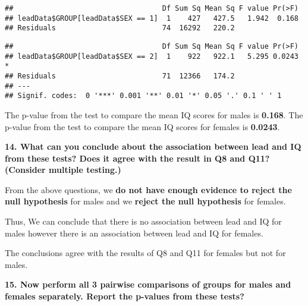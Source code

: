 \documentclass[
]{article}
\newenvironment{Shaded}{\begin{snugshade}}{\end{snugshade}}
\newcommand{\DataTypeTok}[1]{\textcolor[rgb]{0.13,0.29,0.53}{#1}}
\newcommand{\DecValTok}[1]{\textcolor[rgb]{0.00,0.00,0.81}{#1}}
\newcommand{\KeywordTok}[1]{\textcolor[rgb]{0.13,0.29,0.53}{\textbf{#1}}}
\newcommand{\NormalTok}[1]{#1}
\newcommand{\OperatorTok}[1]{\textcolor[rgb]{0.81,0.36,0.00}{\textbf{#1}}}
\newcommand{\StringTok}[1]{\textcolor[rgb]{0.31,0.60,0.02}{#1}}
\begin{document}
\begin{verbatim}
##                                   Df Sum Sq Mean Sq F value Pr(>F)
## leadData$GROUP[leadData$SEX == 1]  1    427   427.5   1.942  0.168
## Residuals                         74  16292   220.2
\end{verbatim}

\begin{Shaded}
\end{Shaded}

\begin{verbatim}
##                                   Df Sum Sq Mean Sq F value Pr(>F)  
## leadData$GROUP[leadData$SEX == 2]  1    922   922.1   5.295 0.0243 *
## Residuals                         71  12366   174.2                 
## ---
## Signif. codes:  0 '***' 0.001 '**' 0.01 '*' 0.05 '.' 0.1 ' ' 1
\end{verbatim}

The p-value from the test to compare the mean IQ scores for males is
\textbf{0.168}. The p-value from the test to compare the mean IQ scores
for females is \textbf{0.0243}.

\textbf{14. What can you conclude about the association between lead and
IQ from these tests? Does it agree with the result in Q8 and Q11?
(Consider multiple testing.)}

From the above questions, we \textbf{do not have enough evidence to
reject the null hypothesis} for males and we \textbf{reject the null
hypothesis} for females.

Thus, We can conclude that there is no association between lead and IQ
for males however there is an association between lead and IQ for
females.

The conclusions agree with the results of Q8 and Q11 for females but not
for males.

\textbf{15. Now perform all 3 pairwise comparisons of groups for males
and females separately. Report the p-values from these tests?}

\begin{Shaded}
\end{Shaded}
\end{document}

